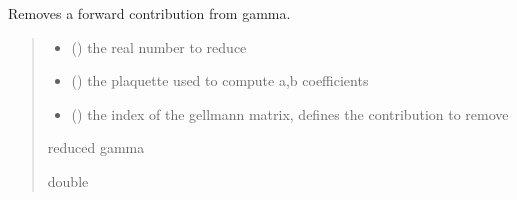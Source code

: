 \documentclass[letterpaper,10pt,english]{sphinxmanual}
\begin{document}

\begin{fulllineitems}
\label{\detokenize{analytical_reject:analytical_reject.retire_contrib_aller}}
\pysigstartsignatures
\pysiglinewithargsret
{}
{\sphinxparamcomma {}\sphinxparamcomma {}}
{}
\pysigstopsignatures
\sphinxAtStartPar
Removes a forward contribution from gamma.
\begin{quote}\begin{description}
\begin{itemize}
\item {} 
\sphinxAtStartPar
{} () \textendash{} the real number to reduce

\item {} 
\sphinxAtStartPar
{} () \textendash{} the plaquette used to compute a,b coefficients

\item {} 
\sphinxAtStartPar
{} () \textendash{} the index of the gell\sphinxhyphen{}mann matrix, defines the contribution to remove

\end{itemize}

\sphinxAtStartPar
reduced gamma

\sphinxAtStartPar
double

\end{description}\end{quote}

\end{fulllineitems}

\end{document}
